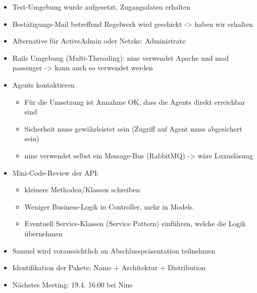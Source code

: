 \documentclass[class=scrbook,crop=false]{standalone}
\begin{document}
    \begin{itemize}
        \item Test-Umgebung wurde aufgesetzt, Zugangsdaten erhalten
        \item Bestätigungs-Mail betreffend Regelwerk wird geschickt -> haben wir erhalten
        \item Alternative für ActiveAdmin oder Netzke: Administrate
        \item Rails Umgebung (Multi-Threading): nine verwendet Apache und mod \textunderscore passenger -> kann auch so verwendet werden
        \item Agents kontaktieren
        \begin{itemize}
            \item Für die Umsetzung ist Annahme OK, dass die Agents direkt erreichbar sind
            \item Sicherheit muss gewährleistet sein (Zugriff auf Agent muss abgesichert sein)
            \item nine verwendet selbst ein Message-Bus (RabbitMQ) -> wäre Luxuslösung
        \end{itemize}
        \item Mini-Code-Review der API:
        \begin{itemize}
            \item kleinere Methoden/Klassen schreiben
            \item Weniger Business-Logik in Controller, mehr in Models.
            \item Eventuell Service-Klassen (Service Pattern) einführen, welche die Logik übernehmen
        \end{itemize}
        \item Samuel wird voraussichtlich an Abschlusspräsentation teilnehmen
        \item Identifikation der Pakete: Name + Architektur + Distribution
        \item Nächstes Meeting: 19.4. 16:00 bei Nine
    \end{itemize}
\end{document}
